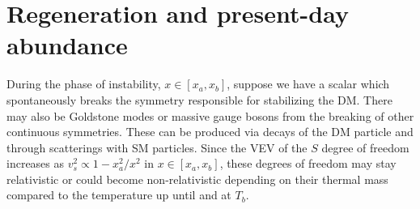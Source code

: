 \section{Regeneration and present-day abundance}
\label{sec:Regen}

During the phase of instability, $x \in [x_a,x_b]$, suppose we have a scalar which spontaneously breaks the symmetry responsible for stabilizing the DM. There may also be Goldstone modes or massive gauge bosons from the breaking of other continuous symmetries. These can be produced via decays of the DM particle and through scatterings with SM particles. Since the VEV of the $S$ degree of freedom increases as $v^2_s \propto 1-x^2_a/x^2$ in $x \in [x_a,x_b]$, these degrees of freedom may stay relativistic or could become non-relativistic depending on their thermal mass compared to the temperature up until and at $T_b$.

